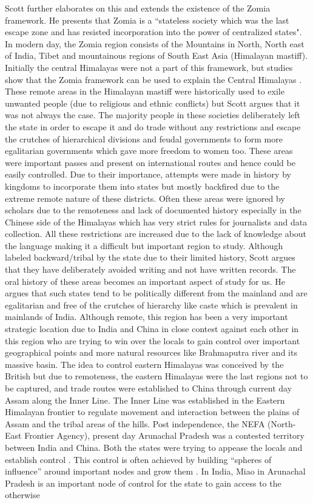 \begin{sloppypar}
Scott \citep{jamesscott} further elaborates on this and extends the existence of the Zomia framework. He presents that Zomia is a ``stateless society which was the last escape zone and has resisted incorporation into the power of centralized states". In modern day, the Zomia region consists of the Mountains in North, North east of India, Tibet and mountainous regions of South East Asia (Himalayan mastiff). Initially the central Himalayas were not a part of this framework, but studies  show that the Zomia framework can be used to explain the Central Himalayas \citep{shneiderman2010central}. These remote areas in the Himalayan mastiff were historically used to exile unwanted people (due to religious and ethnic conflicts) but Scott argues that it was not always the case. The majority people in these societies deliberately left the state in order to escape it and do trade without any restrictions and escape the crutches of hierarchical divisions and feudal governments to form more egalitarian governments which gave more freedom to women too. These areas were important passes and present on international routes and hence could be easily controlled. Due to their importance, attempts were made in history by kingdoms to incorporate them into states but mostly backfired due to the extreme remote nature of these districts. Often these areas were ignored by scholars due to the remoteness and lack of documented history especially in the Chinese side of the Himalayas which has very strict rules for journalists and data collection. All these restrictions are increased due to the lack of knowledge about the language making it a difficult but important region to study. Although labeled backward/tribal by the state due to their limited history, Scott argues that they have deliberately avoided writing and not have written records. The oral history of these areas becomes an important aspect of study for us. He argues that such states tend to be politically different from the mainland and are egalitarian and free of the crutches of hierarchy like caste which is prevalent in mainlands of India. Although remote, this region has been a very important strategic location due to India and China in close contest against each other in this region who are trying to win over the locals to gain control over important geographical points  and more natural resources like Brahmaputra river and its massive basin. The idea to control eastern Himalayas was conceived by the British but due to remoteness, the eastern Himalayas were the last regions not to be captured, and trade routes were established to China through current day Assam along the Inner Line. The Inner Line was established in the Eastern Himalayan frontier to regulate movement and interaction between the plains of Assam and the tribal areas of the hills. Post independence, the NEFA (North-East Frontier Agency), present day Arunachal Pradesh was a contested territory between India and China. Both the states were trying to appease the locals and establish control \citep{guyot2017shadow}. This control is often achieved by building \enquote{spheres of influence} around important nodes and grow them \citep{Farrelly_2013b}. In India, Miao in Arunachal Pradesh is an important node of control for the state to gain access to the otherwise 
\end{sloppypar}
